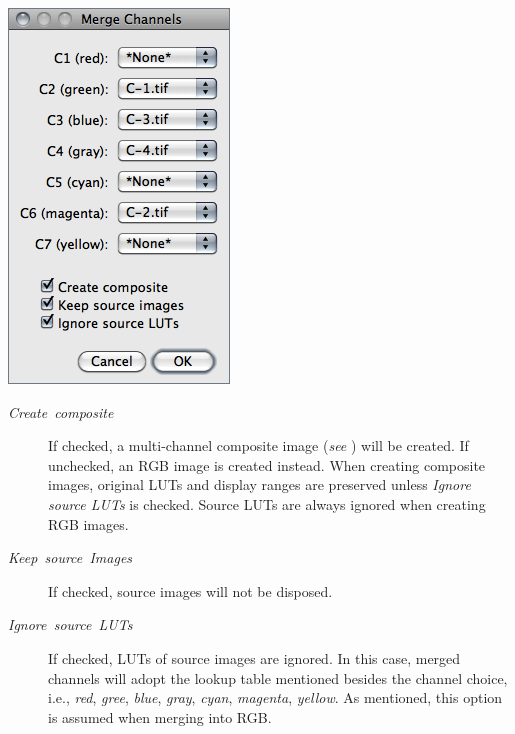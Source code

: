 \begin{minipage}[c][1\totalheight][t]{0.33\columnwidth}%
\includegraphics[scale=0.55]{images/MergeChannels}%
\end{minipage}%
\begin{minipage}[c][1\totalheight][t]{0.67\columnwidth}%
\begin{description}
\item [{\emph{Create\ composite}}] If checked, a multi-channel composite
image (\emph{see} ) will be created.
If unchecked, an RGB image is created instead. When creating composite
images, original LUTs and display ranges are preserved unless \emph{Ignore
source LUTs} is checked. Source LUTs are always ignored when creating
RGB images.
\item [{\emph{Keep\ source\ Images}}] If checked, source images will
not be disposed.
\item [{\emph{Ignore\ source\ LUTs}}] If checked, LUTs of source images
are ignored. In this case, merged channels will adopt the lookup table
mentioned besides the channel choice, i.e., \emph{red}, \emph{gree},
\emph{blue}, \emph{gray},\emph{ cyan}, \emph{magenta}, \emph{yellow}.
As mentioned, this option is assumed when merging into RGB.\end{description}
%
\end{minipage}




\subsubsection{\protect{}\label{sub:ChannelsTool-Color}}

